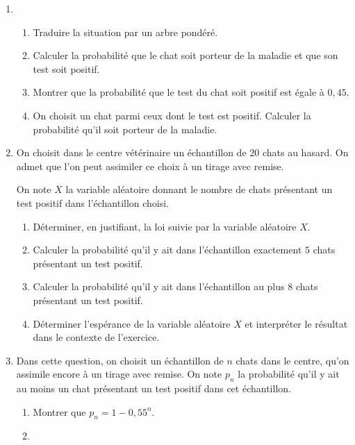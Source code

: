 \begin{enumerate}
\item 
	\begin{enumerate}
		\item Traduire la situation par un arbre pondéré.
		\item Calculer la probabilité que le chat soit porteur de la maladie et que son test soit positif.
		\item Montrer que la probabilité que le test du chat soit positif est égale à $0,45$.
		\item On choisit un chat parmi ceux dont le test est positif. Calculer la probabilité qu'il soit porteur de la maladie.
	\end{enumerate}
\item On choisit dans le centre vétérinaire un échantillon de $20$ chats au hasard. On admet que l'on peut assimiler ce choix à un tirage avec remise.

On note $X$ la variable aléatoire donnant le nombre de chats présentant un test positif dans l'échantillon choisi.
	\begin{enumerate}
		\item Déterminer, en justifiant, la loi suivie par la variable aléatoire $X$.
		\item Calculer la probabilité qu'il y ait dans l'échantillon exactement $5$ chats présentant un test positif.
		\item Calculer la probabilité qu'il y ait dans l'échantillon au plus $8$ chats présentant un test positif.
		\item Déterminer l'espérance de la variable aléatoire $X$ et interpréter le résultat dans le contexte de l'exercice.
	\end{enumerate}		
\item Dans cette question, on choisit un échantillon de $n$ chats dans le centre, qu'on assimile encore à un tirage avec remise. On note $p_n$ la probabilité qu'il y ait au moins un chat présentant un test positif dans cet échantillon.
	\begin{enumerate}
		\item Montrer que $p_n = 1 - 0,55^n$.
		\item ~
		

\end{enumerate}
\end{enumerate}
